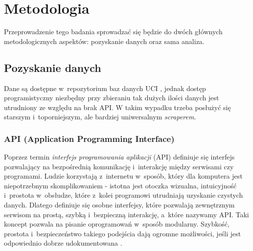 \chapter{Metodologia}

Przeprowadzenie tego badania sprowadzać się będzie do dwóch głównych metodologicznych aspektów: pozyskanie danych oraz sama analiza.

\section{Pozyskanie danych}

Dane są dostępne w~repozytorium baz danych UCI \cite{Dua:2021}, jednak dostęp programistyczny niezbędny przy zbieraniu tak dużych ilości danych jest utrudniony ze względu na brak API.
W takim wypadku trzeba posłużyć się starszym i~toporniejszym, ale bardziej uniwersalnym \emph{scraperem}.

\subsection{API (Application Programming Interface)}

Poprzez termin \emph{interfejs programowania aplikacji} (API) definiuje się interfejs pozwalający na bezpośrednią komunikację i~interakcję między serwisami czy programami.
Ludzie korzystają z~internetu w~sposób, który dla komputera jest niepotrzebnym skomplikowaniem - istotna jest otoczka wizualna, intuicyjność i~prostota w~obsłudze, które z~kolei programowi utrudniają uzyskanie czystych danych.
Dlatego definiuje się osobne interfejsy, które pozwalają zewnętrznym serwisom na prostą, szybką i~bezpieczną interakcję, a~które nazywamy API.
Taki koncept pozwala na pisanie oprogramowań w~sposób modularny.
Szybkość, prostota i~bezpieczeństwo takiego podejścia dają ogromne możliwości, jeśli jest odpowiednio dobrze udokumentowana \cite{meng2018application}.


